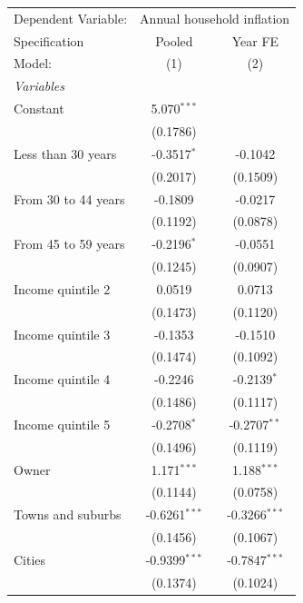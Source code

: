 
\begingroup
\centering
\begin{tabular}{lcc}
   \tabularnewline \midrule \midrule
   Dependent Variable: & \multicolumn{2}{c}{Annual household inflation}\\
   Specification       & Pooled          & Year FE \\   
   Model:              & (1)             & (2)\\  
   \midrule
   \emph{Variables}\\
   Constant            & 5.070$^{***}$   &   \\   
                       & (0.1786)        &   \\   
   Less than 30 years  & -0.3517$^{*}$   & -0.1042\\   
                       & (0.2017)        & (0.1509)\\   
   From 30 to 44 years & -0.1809         & -0.0217\\   
                       & (0.1192)        & (0.0878)\\   
   From 45 to 59 years & -0.2196$^{*}$   & -0.0551\\   
                       & (0.1245)        & (0.0907)\\   
   Income quintile 2   & 0.0519          & 0.0713\\   
                       & (0.1473)        & (0.1120)\\   
   Income quintile 3   & -0.1353         & -0.1510\\   
                       & (0.1474)        & (0.1092)\\   
   Income quintile 4   & -0.2246         & -0.2139$^{*}$\\   
                       & (0.1486)        & (0.1117)\\   
   Income quintile 5   & -0.2708$^{*}$   & -0.2707$^{**}$\\   
                       & (0.1496)        & (0.1119)\\   
   Owner               & 1.171$^{***}$   & 1.188$^{***}$\\   
                       & (0.1144)        & (0.0758)\\   
   Towns and suburbs   & -0.6261$^{***}$ & -0.3266$^{***}$\\   
                       & (0.1456)        & (0.1067)\\   
   Cities              & -0.9399$^{***}$ & -0.7847$^{***}$\\   
                       & (0.1374)        & (0.1024)\\   

\end{tabular}
